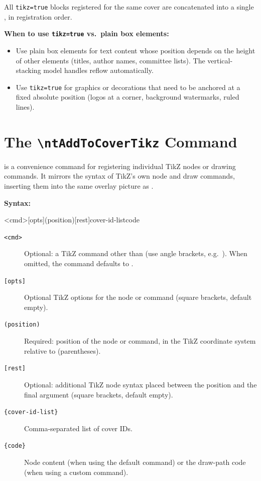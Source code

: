 All \texttt{tikz=true} blocks registered for the same cover are concatenated
into a single , in registration order.

\medskip
\noindent\textbf{When to use \texttt{tikz=true} vs.\ plain box elements:}
\begin{itemize}
  \item Use plain box elements for text content whose position depends on the
        height of other elements (titles, author names, committee lists).
        The vertical-stacking model handles reflow automatically.
  \item Use \texttt{tikz=true} for graphics or decorations that need to be
        anchored at a fixed absolute position (logos at a corner, background
        watermarks, ruled lines).
\end{itemize}


\section{The \texttt{\textbackslash ntAddToCoverTikz} Command}
\label{sec:ntaddtocovertikz}

\latexinline{\ntAddToCoverTikz} is a convenience command for registering individual
TikZ nodes or drawing commands.  It mirrors the syntax of TikZ's own node
and draw commands, inserting them into the same overlay picture as
\latexinline{\ntaddtocover[tikz]}.

\medskip
\noindent\textbf{Syntax:}
\begin{latexcode}
\ntAddToCoverTikz<cmd>[opts](position)[rest]{cover-id-list}{code}
\end{latexcode}

\begin{description}
  \item[\texttt{<cmd>}] Optional: a TikZ command other than \latexinline{\node}
        (use angle brackets, e.g.\ \latexinline{<\draw>}).  When omitted, the
        command defaults to \latexinline{\node}.
  \item[\texttt{[opts]}] Optional TikZ options for the node or command (square
        brackets, default empty).
  \item[\texttt{(position)}] Required: position of the node or command, in
        the TikZ coordinate system relative to  (parentheses).
  \item[\texttt{[rest]}] Optional: additional TikZ node syntax placed between
        the position and the final  argument (square brackets,
        default empty).
  \item[\texttt{\{cover-id-list\}}] Comma-separated list of cover IDs.
  \item[\texttt{\{code\}}] Node content (when using the default \latexinline{\node}
        command) or the draw-path code (when using a custom command).
\end{description}

